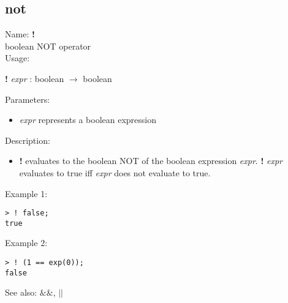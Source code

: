 \subsection{ not }
\noindent Name: \textbf{!}\\
boolean NOT operator\\

\noindent Usage: 
\begin{center}
\textbf{!} \emph{expr} : \textsf{boolean} $\rightarrow$ \textsf{boolean}\\
\end{center}
Parameters: 
\begin{itemize}
\item \emph{expr} represents a boolean expression
\end{itemize}
\noindent Description: \begin{itemize}

\item \textbf{!} evaluates to the boolean NOT of the boolean expression
   \emph{expr}. \textbf{!} \emph{expr} evaluates to true iff \emph{expr} does not evaluate
   to true.
\end{itemize}
\noindent Example 1: 
\begin{center}\begin{minipage}{15cm}\begin{Verbatim}[frame=single]
> ! false;
true
\end{Verbatim}
\end{minipage}\end{center}
\noindent Example 2: 
\begin{center}\begin{minipage}{15cm}\begin{Verbatim}[frame=single]
> ! (1 == exp(0));
false
\end{Verbatim}
\end{minipage}\end{center}
See also: \textbf{$\&\&$}, \textbf{$||$}
